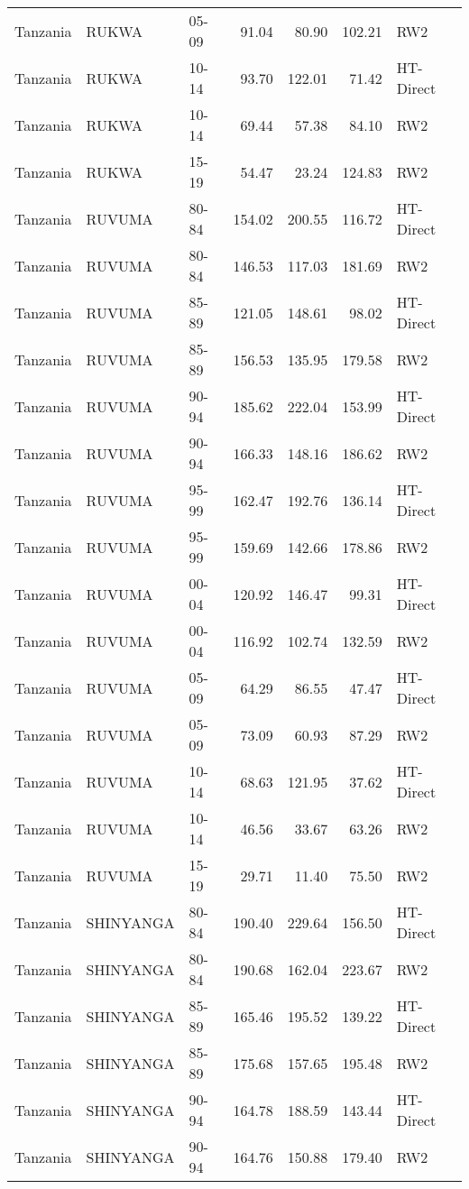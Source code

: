 \begin{longtable}{lllrrrl}
  Tanzania & RUKWA & 05-09 & 91.04 & 80.90 & 102.21 & RW2 \\ 
  Tanzania & RUKWA & 10-14 & 93.70 & 122.01 & 71.42 & HT-Direct \\ 
  Tanzania & RUKWA & 10-14 & 69.44 & 57.38 & 84.10 & RW2 \\ 
  Tanzania & RUKWA & 15-19 & 54.47 & 23.24 & 124.83 & RW2 \\ 
  Tanzania & RUVUMA & 80-84 & 154.02 & 200.55 & 116.72 & HT-Direct \\ 
  Tanzania & RUVUMA & 80-84 & 146.53 & 117.03 & 181.69 & RW2 \\ 
  Tanzania & RUVUMA & 85-89 & 121.05 & 148.61 & 98.02 & HT-Direct \\ 
  Tanzania & RUVUMA & 85-89 & 156.53 & 135.95 & 179.58 & RW2 \\ 
  Tanzania & RUVUMA & 90-94 & 185.62 & 222.04 & 153.99 & HT-Direct \\ 
  Tanzania & RUVUMA & 90-94 & 166.33 & 148.16 & 186.62 & RW2 \\ 
  Tanzania & RUVUMA & 95-99 & 162.47 & 192.76 & 136.14 & HT-Direct \\ 
  Tanzania & RUVUMA & 95-99 & 159.69 & 142.66 & 178.86 & RW2 \\ 
  Tanzania & RUVUMA & 00-04 & 120.92 & 146.47 & 99.31 & HT-Direct \\ 
  Tanzania & RUVUMA & 00-04 & 116.92 & 102.74 & 132.59 & RW2 \\ 
  Tanzania & RUVUMA & 05-09 & 64.29 & 86.55 & 47.47 & HT-Direct \\ 
  Tanzania & RUVUMA & 05-09 & 73.09 & 60.93 & 87.29 & RW2 \\ 
  Tanzania & RUVUMA & 10-14 & 68.63 & 121.95 & 37.62 & HT-Direct \\ 
  Tanzania & RUVUMA & 10-14 & 46.56 & 33.67 & 63.26 & RW2 \\ 
  Tanzania & RUVUMA & 15-19 & 29.71 & 11.40 & 75.50 & RW2 \\ 
  Tanzania & SHINYANGA & 80-84 & 190.40 & 229.64 & 156.50 & HT-Direct \\ 
  Tanzania & SHINYANGA & 80-84 & 190.68 & 162.04 & 223.67 & RW2 \\ 
  Tanzania & SHINYANGA & 85-89 & 165.46 & 195.52 & 139.22 & HT-Direct \\ 
  Tanzania & SHINYANGA & 85-89 & 175.68 & 157.65 & 195.48 & RW2 \\ 
  Tanzania & SHINYANGA & 90-94 & 164.78 & 188.59 & 143.44 & HT-Direct \\ 
  Tanzania & SHINYANGA & 90-94 & 164.76 & 150.88 & 179.40 & RW2 \\ 

\end{longtable}
